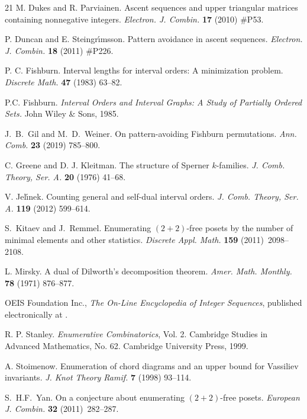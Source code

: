 \documentclass[11pt]{article}
\begin{document}
\begin{thebibliography}{21}
		 M. Dukes and R. Parviainen. Ascent sequences and upper triangular matrices containing nonnegative integers. \textit{Electron. J. Combin.} {\bf 17} (2010) \#P53.
		
		 P. Duncan and E. Steingr\'{\i}msson. Pattern avoidance in ascent sequences. \textit{Electron. J. Combin.} {\bf 18} (2011) \#P226.
		
		
		 P. C. Fishburn. Interval lengths for interval orders: A minimization problem. {\it Discrete Math.} {\bf 47} (1983) 63--82.
		
		 P.C. Fishburn. {\it Interval Orders and Interval Graphs: A Study of Partially Ordered Sets.} John Wiley \& Sons, 1985.
		
		 J.~B.~Gil and M.~D.~Weiner. On pattern-avoiding Fishburn permutations. {\it Ann. Comb.} {\bf 23} (2019) 785--800. 
		
		 C. Greene and D. J. Kleitman. The structure of Sperner $k$-families.
		\textit{J. Comb. Theory, Ser. A.} {\bf 20} (1976) 41--68.
		
		 V. Jel\'{\i}nek. Counting general and self-dual interval orders. {\it J. Comb. Theory, Ser. A.} {\bf 119} (2012) 599--614.
		
		 S.~Kitaev and J.~Remmel. Enumerating $(2{+}2)$-free posets by the number of minimal elements and other statistics.
		\textit{Discrete
			Appl. Math.} {\bf 159} (2011)~2098--2108.
		
		 L. Mirsky. A dual of Dilworth’s decomposition theorem. {\it Amer. Math. Monthly.} {\bf 78} (1971) 876--877. 
		
		 OEIS Foundation Inc., \textit{The {O}n-{L}ine {E}ncyclopedia of {I}nteger {S}equences},
		published electronically at \phantom{*}{\tt
			https://oeis.org}.
		
		 R. P. Stanley. \textit{Enumerative Combinatorics}, Vol. 2. Cambridge Studies in Advanced Mathematics, No. 62. Cambridge University Press, 1999.
		
		 A. Stoimenow. Enumeration of chord diagrams and an upper bound for Vassiliev invariants. \textit{J. Knot Theory Ramif.} {\bf 7} (1998) 93--114.
		
		 S.~H.F.~Yan. On a conjecture about enumerating $(2{+}2)$-free posets.
		\textit{European J. Combin.} {\bf 32} (2011)~282--287.
		
	\end{thebibliography}
	
\end{document}
